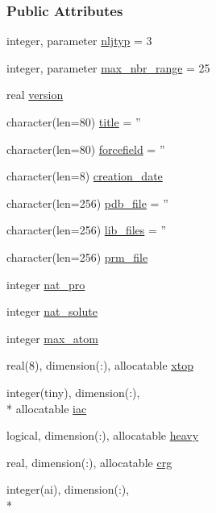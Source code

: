 \subsubsection*{Public Attributes}
\begin{DoxyCompactItemize}
\item 
integer, parameter \hyperlink{classtopo_a81ba8fdc81bafeeebc27023f5e279b61}{nljtyp} = 3
\item 
integer, parameter \hyperlink{classtopo_a829add9eca19b5542187f422aca77837}{max\-\_\-nbr\-\_\-range} = 25
\item 
real \hyperlink{classtopo_a617c819365f4a269fda75bb3a4e3829e}{version}
\item 
character(len=80) \hyperlink{classtopo_aeed5c7dad044f283eead0024edd1c4d2}{title} = ''
\item 
character(len=80) \hyperlink{classtopo_a8ae816563184073254a1590f00d34844}{forcefield} = ''
\item 
character(len=8) \hyperlink{classtopo_a89837e9df3b93b954210d3f9b7f6ed4b}{creation\-\_\-date}
\item 
character(len=256) \hyperlink{classtopo_a90f0e1e8f5270c20cb96cdaa565c7d5b}{pdb\-\_\-file} = ''
\item 
character(len=256) \hyperlink{classtopo_a36d8911e30fa5afaf992961a17174479}{lib\-\_\-files} = ''
\item 
character(len=256) \hyperlink{classtopo_a49ba5e9d5475fd58013ee8e5931480b0}{prm\-\_\-file}
\item 
integer \hyperlink{classtopo_a9c36bc3f022fb8a4dbb82c24369a4dc9}{nat\-\_\-pro}
\item 
integer \hyperlink{classtopo_aa2c11d8a835cd358961ef16ed23e444b}{nat\-\_\-solute}
\item 
integer \hyperlink{classtopo_a3ab7b1b9142e0426e8b147a00c78f36c}{max\-\_\-atom}
\item 
real(8), dimension(\-:), allocatable \hyperlink{classtopo_a401594110af6e631225453a47e150299}{xtop}
\item 
integer(tiny), dimension(\-:), \\*
allocatable \hyperlink{classtopo_ae4a49e34cb36ac8f97b97dc0ed0dc467}{iac}
\item 
logical, dimension(\-:), allocatable \hyperlink{classtopo_add92afa3ae9b74baac3b28ec0c65b5bd}{heavy}
\item 
real, dimension(\-:), allocatable \hyperlink{classtopo_a19aa89f2c73146419d066f95e7d789b4}{crg}
\item 
integer(ai), dimension(\-:), \\*

\end{DoxyCompactItemize}

